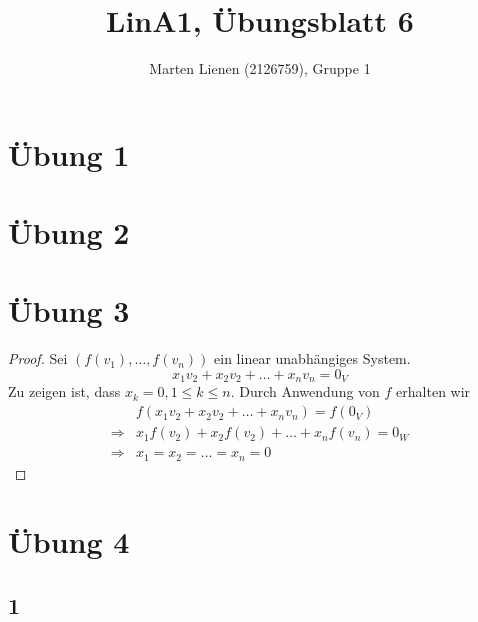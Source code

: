 \documentclass[a4paper,10pt]{article}
\title{LinA1, Übungsblatt 6}
\author{Marten Lienen (2126759), Gruppe 1}
\begin{document}
\maketitle

\section*{Übung 1}

\section*{Übung 2}

\section*{Übung 3}

\begin{proof}
 Sei $(f(v_1), \dots, f(v_n))$ ein linear unabhängiges System.
 \begin{equation}
  x_1v_2 + x_2v_2 + \dots + x_nv_n = 0_V
 \end{equation}
 Zu zeigen ist, dass $x_k = 0, 1 \le k \le n$.
 Durch Anwendung von $f$ erhalten wir
 \begin{align*}
  & f(x_1v_2 + x_2v_2 + \dots + x_nv_n) = f(0_V)\\
  \Rightarrow & x_1f(v_2) + x_2f(v_2) + \dots + x_nf(v_n) = 0_W\\
  \Rightarrow & x_1 = x_2 = \dots = x_n = 0
 \end{align*}
\end{proof}

\section*{Übung 4}

\subsection*{1}
\end{document}
